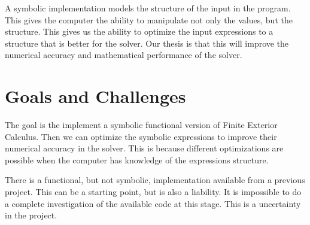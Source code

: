\documentclass{scrartcl}
\begin{document}


A symbolic implementation models the structure of the input in the program.
This gives the computer the ability to manipulate not only the values, but the
structure. This gives us the ability to optimize the input expressions to
a structure that is better for the solver. Our thesis is that this will improve
the numerical accuracy and mathematical performance of the solver.




\section{Goals and Challenges}

The goal is the implement a symbolic functional version of Finite Exterior
Calculus.  Then we can optimize the symbolic expressions to improve their
numerical accuracy in the solver. This is because different optimizations are
possible when the computer has knowledge of the expressions structure.




There is a functional, but not symbolic, implementation available from
a previous project. This can be a starting point, but is also a liability.
It is impossible to do a complete investigation of the available code at this stage.  This is a uncertainty in the project.
\end{document}
